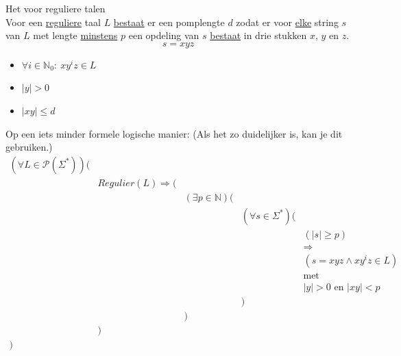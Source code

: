 \documentclass[main.tex]{subfiles}
\begin{document}
\begin{lem}
  Het  voor reguliere talen\\
  Voor een \underline{reguliere} taal $L$ \underline{bestaat} er een pomplengte $d$ zodat er voor \underline{elke} string $s$ van $L$ met lengte \underline{minstens} $p$ een opdeling van $s$ \underline{bestaat} in drie stukken $x$, $y$ en $z$.
  \[ s = xyz \]
  \begin{itemize}
  \item $\forall i \in \mathbb{N}_{0}:\ xy^{i}z \in L$
  \item $|y| > 0$
  \item $|xy| \le d$
  \end{itemize}
\end{lem}
Op een iets minder formele logische manier: (Als het zo duidelijker is, kan je dit gebruiken.)
\[
\begin{array}{rrrrl}
  (\forall L\in \mathcal{P}(\Sigma^{*})) (&\\
               & Regulier(L) \Rightarrow (&\\
               &                             & (\exists p\in \mathbb{N})(&\\
               &                             &                           &(\forall s \in \Sigma^{*})(&\\
               &                             &                           &                           & (|s| \ge p)\\
               &                             &                           &                           & \Rightarrow\\
               &                             &                           &                           & (s = xyz \wedge xy^{i}z \in L)\\
               &                             &                           &                           & \text{met}\\
               &                             &                           &                           & |y| > 0 \text{ en } |xy| < p\\
               &                             &                           &                          )&\\
               &                             &                          )&\\
               &                            )&\\
              )&\\ 
\end{array}
\]
\end{document}
